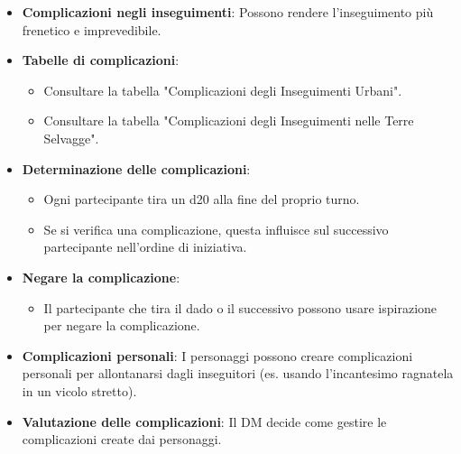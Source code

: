 \begin{itemize}
    \item \textbf{Complicazioni negli inseguimenti}: Possono rendere l'inseguimento più frenetico e imprevedibile.
    \item \textbf{Tabelle di complicazioni}: 
    \begin{itemize}
        \item Consultare la tabella "Complicazioni degli Inseguimenti Urbani".
        \item Consultare la tabella "Complicazioni degli Inseguimenti nelle Terre Selvagge".
    \end{itemize}
    \item \textbf{Determinazione delle complicazioni}: 
    \begin{itemize}
        \item Ogni partecipante tira un d20 alla fine del proprio turno.
        \item Se si verifica una complicazione, questa influisce sul successivo partecipante nell'ordine di iniziativa.
    \end{itemize}
    \item \textbf{Negare la complicazione}: 
    \begin{itemize}
        \item Il partecipante che tira il dado o il successivo possono usare ispirazione per negare la complicazione.
    \end{itemize}
    \item \textbf{Complicazioni personali}: I personaggi possono creare complicazioni personali per allontanarsi dagli inseguitori (es. usando l'incantesimo ragnatela in un vicolo stretto).
    \item \textbf{Valutazione delle complicazioni}: Il DM decide come gestire le complicazioni create dai personaggi.
\end{itemize}

